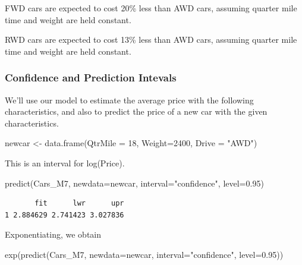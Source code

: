 \documentclass[
  letterpaper,
  DIV=11,
  numbers=noendperiod]{scrreprt}
\newenvironment{Shaded}{\begin{snugshade}}{\end{snugshade}}
\newcommand{\AttributeTok}[1]{\textcolor[rgb]{0.40,0.45,0.13}{#1}}
\newcommand{\DecValTok}[1]{\textcolor[rgb]{0.68,0.00,0.00}{#1}}
\newcommand{\FloatTok}[1]{\textcolor[rgb]{0.68,0.00,0.00}{#1}}
\newcommand{\FunctionTok}[1]{\textcolor[rgb]{0.28,0.35,0.67}{#1}}
\newcommand{\NormalTok}[1]{\textcolor[rgb]{0.00,0.23,0.31}{#1}}
\newcommand{\OtherTok}[1]{\textcolor[rgb]{0.00,0.23,0.31}{#1}}
\newcommand{\StringTok}[1]{\textcolor[rgb]{0.13,0.47,0.30}{#1}}
\begin{document}
FWD cars are expected to cost 20\% less than AWD cars, assuming quarter
mile time and weight are held constant.

RWD cars are expected to cost 13\% less than AWD cars, assuming quarter
mile time and weight are held constant.

\subsubsection{Confidence and Prediction
Intevals}\label{confidence-and-prediction-intevals}

We'll use our model to estimate the average price with the following
characteristics, and also to predict the price of a new car with the
given characteristics.

\begin{Shaded}
\begin{Highlighting}[]
\NormalTok{newcar }\OtherTok{\textless{}{-}} \FunctionTok{data.frame}\NormalTok{(}\AttributeTok{QtrMile =} \DecValTok{18}\NormalTok{, }\AttributeTok{Weight=}\DecValTok{2400}\NormalTok{, }\AttributeTok{Drive =} \StringTok{"AWD"}\NormalTok{)}
\end{Highlighting}
\end{Shaded}

This is an interval for log(Price).

\begin{Shaded}
\begin{Highlighting}[]
\FunctionTok{predict}\NormalTok{(Cars\_M7, }\AttributeTok{newdata=}\NormalTok{newcar, }\AttributeTok{interval=}\StringTok{"confidence"}\NormalTok{, }\AttributeTok{level=}\FloatTok{0.95}\NormalTok{)}
\end{Highlighting}
\end{Shaded}

\begin{verbatim}
       fit      lwr      upr
1 2.884629 2.741423 3.027836
\end{verbatim}

Exponentiating, we obtain

\begin{Shaded}
\begin{Highlighting}[]
\FunctionTok{exp}\NormalTok{(}\FunctionTok{predict}\NormalTok{(Cars\_M7, }\AttributeTok{newdata=}\NormalTok{newcar, }\AttributeTok{interval=}\StringTok{"confidence"}\NormalTok{, }\AttributeTok{level=}\FloatTok{0.95}\NormalTok{))}
\end{Highlighting}
\end{Shaded}
\end{document}
